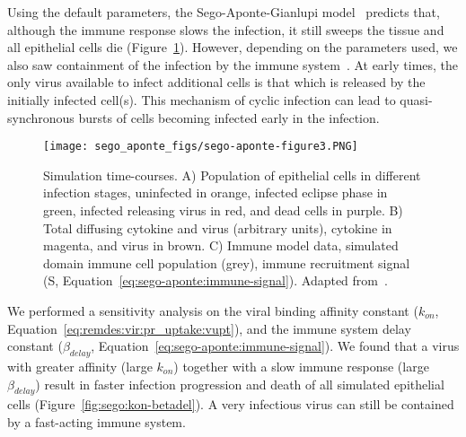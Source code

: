 Using the default parameters, the Sego-Aponte-Gianlupi model~\cite{sego_modular_2020} predicts that, although the immune response slows the infection, it still sweeps the tissue and all epithelial cells die (Figure~\ref{fig:sego:progression}). However, depending on the parameters used, we also saw containment of the infection by the immune system~\cite{sego_modular_2020}. At early times, the only virus available to infect additional cells is that which is released by the initially infected cell(s). This mechanism of cyclic infection can lead to quasi-synchronous bursts of cells becoming infected early in the infection. 

\begin{figure}[H]
    \centering
    \texttt{[image: sego\_aponte\_figs/sego-aponte-figure3.PNG]}
    \caption{Simulation time-courses. A) Population of epithelial cells in different infection stages, uninfected in orange, infected eclipse phase in green, infected releasing virus in red, and dead cells in purple. B) Total diffusing cytokine and virus (arbitrary units), cytokine in magenta, and virus in brown. C) Immune model data, simulated domain immune cell population (grey), immune recruitment signal (S, Equation~\ref{eq:sego-aponte:immune-signal}). Adapted from~\cite{sego_modular_2020}.}
    \label{fig:sego:progression}
\end{figure}

We performed a sensitivity analysis on the viral binding affinity constant ($k_{on}$, Equation~\ref{eq:remdes:vir:pr_uptake:vupt}), and the immune system delay constant ($\beta_{delay}$, Equation~\ref{eq:sego-aponte:immune-signal}). We found that a virus with greater affinity (large $k_{on}$) together with a slow immune response (large $\beta_{delay}$) result in faster infection progression and death of all simulated epithelial cells (Figure~\ref{fig:sego:kon-betadel}). A very infectious virus can still be contained by a fast-acting immune system. 


